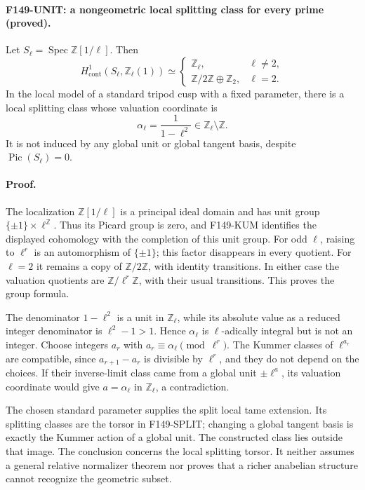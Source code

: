 \paragraph{F149-UNIT: a nongeometric local splitting class for every prime
(proved).}
Let \(S_\ell=\operatorname{Spec}\mathbb Z[1/\ell]\).  Then
\[
 H^1_{\mathrm{cont}}(S_\ell,\mathbb Z_\ell(1))
 \simeq
 \begin{cases}
 \mathbb Z_\ell,&\ell\ne2,\\
 \mathbb Z/2\mathbb Z\oplus\mathbb Z_2,&\ell=2.
 \end{cases}
\]
In the local model of a standard tripod cusp with a fixed parameter,
there is a local splitting class whose valuation coordinate is
\[
 \alpha_\ell=\frac{1}{1-\ell^2}\in\mathbb Z_\ell\setminus\mathbb Z.
 \tag{F149-UNIT}
\]
It is not induced by any global unit or global tangent basis, despite
\(\operatorname{Pic}(S_\ell)=0\).

\paragraph{Proof.}
The localization \(\mathbb Z[1/\ell]\) is a principal ideal domain and
has unit group \(\{\pm1\}\times\ell^{\mathbb Z}\).  Thus its Picard group
is zero, and F149-KUM identifies the displayed cohomology with the
completion of this unit group.  For odd \(\ell\), raising to
\(\ell^r\) is an automorphism of \(\{\pm1\}\); this factor disappears
in every quotient.  For \(\ell=2\) it remains a copy of
\(\mathbb Z/2\mathbb Z\), with identity transitions.  In either case
the valuation quotients are \(\mathbb Z/\ell^r\mathbb Z\), with their
usual transitions.  This proves the group formula.

The denominator \(1-\ell^2\) is a unit in \(\mathbb Z_\ell\), while
its absolute value as a reduced integer denominator is
\(\ell^2-1>1\).  Hence \(\alpha_\ell\) is \(\ell\)-adically integral
but is not an integer.  Choose integers \(a_r\) with
\(a_r\equiv\alpha_\ell\pmod{\ell^r}\).  The Kummer classes of
\(\ell^{a_r}\) are compatible, since
\(a_{r+1}-a_r\) is divisible by \(\ell^r\), and they do not depend
on the choices.  If their inverse-limit class came from a global
unit \(\pm\ell^a\), its valuation coordinate would give
\(a=\alpha_\ell\) in \(\mathbb Z_\ell\), a contradiction.

The chosen standard parameter supplies the split local tame extension.
Its splitting classes are the torsor in F149-SPLIT; changing a global
tangent basis is exactly the Kummer action of a global unit.  The
constructed class lies outside that image.  The conclusion concerns
the local splitting torsor.  It neither assumes a general relative
normalizer theorem nor proves that a richer anabelian structure cannot
recognize the geometric subset.

